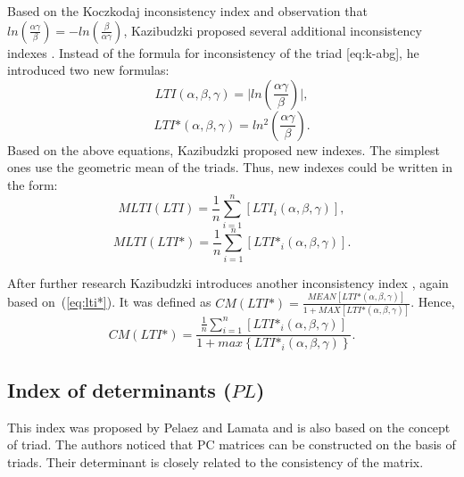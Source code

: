 Based on the Koczkodaj inconsistency index and observation that $ln\left(\frac{\alpha\gamma}{\beta}\right)=-ln\left(\frac{\beta}{\alpha\gamma}\right)$, Kazibudzki proposed several additional inconsistency indexes \cite{Kazibudzki2016}. Instead of the formula for inconsistency of the triad [eq:k-abg], he introduced two new formulas:
	\begin{equation} 
		\textit{LTI}(\alpha,\beta,\gamma)=\bigl\lvert ln\left(\frac{\alpha\gamma}{\beta}\right)\bigr\rvert,
	 \end{equation}
	\begin{equation}
		\label{eq:lti*} 
		\textit{LTI*}\left(\alpha,\beta,\gamma\right)=ln^{2}\left(\frac{\alpha\gamma}{\beta}\right).
	 \end{equation}
Based on the above equations, Kazibudzki proposed new indexes. The simplest ones use the geometric mean of the triads. Thus, new indexes could be written in the form:
	\begin{equation} 
	\textit{MLTI}(\textit{LTI})=\frac{1}{n}\sum_{i=1}^{n}\left[\textit{LTI}_{i}(\alpha,\beta,\gamma)\right],
	 \end{equation}
 	\begin{equation} 
		\textit{MLTI}(\textit{LTI*})=\frac{1}{n}\sum_{i=1}^{n}\left[\textit{LTI*}_{i}(\alpha,\beta,\gamma)\right].
			 \end{equation}
 

After further research Kazibudzki introduces another inconsistency index \cite{Kazibudzki2017}, again based on~(\ref{eq:lti*}). It was defined as $\textit{CM}(\textit{LTI*})=\frac{\textit{MEAN}[\textit{LTI*}(\alpha,\beta,\gamma)]}{1+\textit{MAX}[\textit{LTI*}(\alpha,\beta,\gamma)]}$. Hence,
	\begin{equation} 
		\textit{CM}(\textit{LTI*})=\frac{\frac{1}{n}\sum_{i=1}^{n}[\textit{LTI*}_{i}(\alpha,\beta,\gamma)]}{1+max\left\{\textit{LTI*}_{i}(\alpha,\beta,\gamma)\right\}}.
	 \end{equation}
 

\subsection{Index of determinants ($\textit{PL}$)}

This index was proposed by Pelaez and Lamata \cite{PELAEZ2003} and is also based on the concept of triad. The authors noticed that PC  matrices can be constructed on the basis of triads. Their determinant is closely related to the consistency of the matrix.

